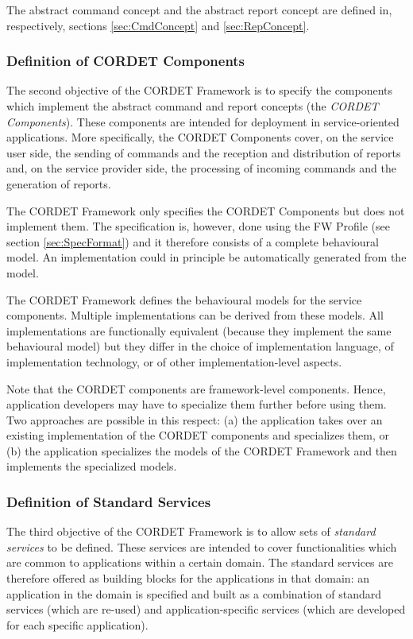 \documentclass[a4paper,10pt]{article}
\begin{document}
The abstract command concept and the abstract report concept are defined in, respectively, sections \ref{sec:CmdConcept} and \ref{sec:RepConcept}.


\subsubsection{Definition of CORDET Components}\label{sec:DefCrCmp}
The second objective of the CORDET Framework is to specify the components which implement the abstract command and report concepts (the \textit{CORDET Components}). 
These components are intended for deployment in service-oriented applications. 
More specifically, the CORDET Components cover, on the service user side, the sending of commands and the reception and distribution of reports and, on the service provider side, the processing of incoming commands and the generation of reports.

The CORDET Framework only specifies the CORDET Components but does not implement them. 
The specification is, however, done using the FW Profile (see section \ref{sec:SpecFormat}) and it therefore consists of a complete behavioural model. 
An implementation could in principle be automatically generated from the model. 

The CORDET Framework defines the behavioural models for the service components. 
Multiple implementations can be derived from these models. 
All implementations are functionally equivalent (because they implement the same behavioural model) but they differ in the choice of implementation language, of implementation technology, or of other implementation-level aspects. 

Note that the CORDET components are framework-level components. 
Hence, application developers may have to specialize them further before using them. 
Two approaches are possible in this respect: (a) the application takes over an existing implementation of the CORDET components and specializes them, or (b) the application specializes the models of the CORDET Framework and then implements the specialized models.

\subsubsection{Definition of Standard Services}\label{sec:StdServ}
The third objective of the CORDET Framework is to allow sets of \textit{standard services} to be defined. 
These services are intended to cover functionalities which are common to applications within a certain domain. 
The standard services are therefore offered as building blocks for the applications in that domain: 
an application in the domain is specified and built as a combination of standard services (which are re-used) and application-specific services (which are developed for each specific application).
\end{document}

